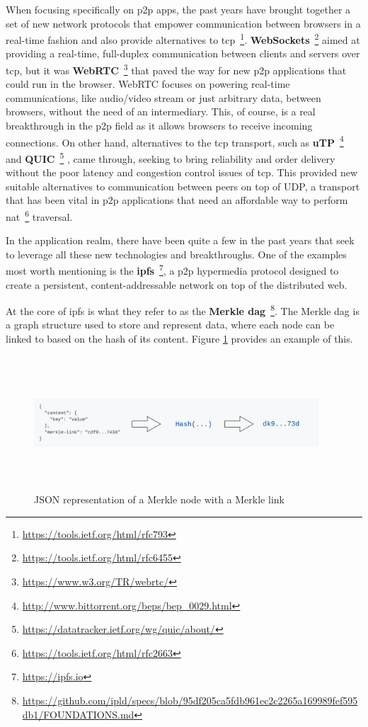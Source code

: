 When focusing specifically on \acrshort{p2p} apps, the past years have brought
together a set of new network protocols that empower communication between
browsers in a real-time fashion and also provide alternatives to
\acrshort{tcp}~\footnote{\url{https://tools.ietf.org/html/rfc793}}.
\textbf{WebSockets}~\footnote{\url{https://tools.ietf.org/html/rfc6455}} aimed at
providing a real-time, full-duplex communication between clients and servers
over \acrshort{tcp}, but it was
\textbf{WebRTC}~\footnote{\url{https://www.w3.org/TR/webrtc/}} that paved the way for
new \acrshort{p2p} applications that could run in the browser. WebRTC focuses
on powering real-time communications, like audio/video stream or just arbitrary
data, between browsers, without the need of an intermediary. This, of course,
is a real breakthrough in the \acrshort{p2p} field as it allows browsers to
receive incoming connections. On other hand, alternatives to the \acrshort{tcp}
transport, such as
\textbf{uTP}~\footnote{\url{http://www.bittorrent.org/beps/bep\_0029.html}} and
\textbf{QUIC}~\footnote{\url{https://datatracker.ietf.org/wg/quic/about/}} , came
through, seeking to bring reliability and order delivery without the poor
latency and congestion control issues of \acrshort{tcp}. This provided new
suitable alternatives to communication between peers on top of UDP, a transport
that has been vital in \acrshort{p2p} applications that need an affordable way
to perform \acrshort{nat}~\footnote{\url{https://tools.ietf.org/html/rfc2663}}
traversal.

In the application realm, there have been quite a few in the past years
that seek to leverage all these new technologies and breakthroughs. One
of the examples most worth mentioning is the \textbf{\acrfull{ipfs}}~\footnote{\url{https://ipfs.io}}, a \acrshort{p2p} hypermedia protocol designed
to create a persistent, content-addressable network on top of the
distributed web.

At the core of \acrshort{ipfs} is what they refer to as the \textbf{Merkle
\acrshort{dag}}~\footnote{\url{https://github.com/ipld/specs/blob/95df205ca5fdb961ec2c2265a169989fef595db1/FOUNDATIONS.md}}.
The Merkle \acrshort{dag} is a graph structure used to store and represent data, where
each node can be linked to based on the hash of its content. Figure
\ref{fig:merkle-node} provides an example of this. 

\begin{figure}[hb!]
  \centering
  \includegraphics[max height=5cm,max width=0.95\textwidth]{img/merkle-node.png}
  \caption{JSON representation of a Merkle node with a Merkle link}
  \label{fig:merkle-node}
\end{figure}

